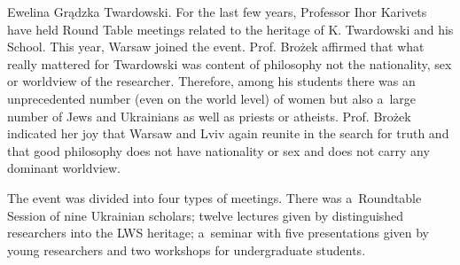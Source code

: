 \begin{editorialeng}{Ewelina Grądzka}
Twardowski. For the last few years, Professor Ihor Karivets have held Round Table meetings related to the heritage of K. Twardowski and his School. This year, Warsaw joined the event. Prof. Brożek affirmed that what really mattered for Twardowski was content of philosophy not the nationality, sex or worldview of the researcher. Therefore, among his students there was an unprecedented number (even on the world level) of women but also a~large number of Jews and Ukrainians as well as priests or atheists. Prof. Brożek indicated her joy that Warsaw and Lviv again reunite in the search for truth and that good philosophy does not have nationality or sex and does not carry any dominant worldview.

The event was divided into four types of meetings. There was a~Roundtable Session of nine Ukrainian scholars; twelve lectures given by distinguished researchers into the LWS heritage; a~seminar with five presentations given by young researchers and two workshops for undergraduate students.


\end{editorialeng}
